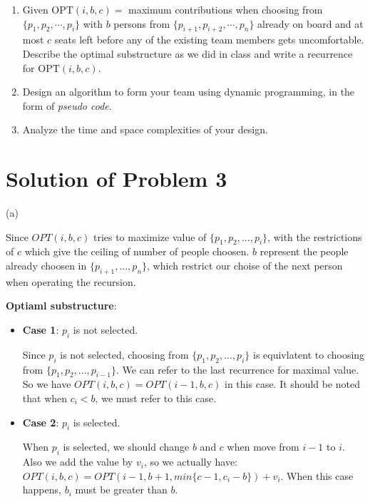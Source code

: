 \documentclass[12pt,a4paper]{article}
\theoremstyle{definition}
\begin{document}
\begin{enumerate}
	\begin{enumerate}
		\item Given $\text{OPT}(i, b, c)=$ maximum contributions when choosing from $\{p_1, p_2, \cdots, p_i\}$ with $b$ persons from $\{p_{i+1}, p_{i+2}, \cdots, p_n\}$ already on board and at most $c$ seats left before any of the existing team members gets uncomfortable. Describe the optimal substructure as we did in class and write a recurrence for $\text{OPT}(i, b, c)$.
		\item Design an algorithm to form your team using dynamic programming, in the form of \emph{pseudo code}.
        \item Analyze the time and space complexities of your design.
	\end{enumerate}
\end{enumerate}

\section*{Solution of Problem 3}

(a)

Since $OPT(i, b, c)$ tries to maximize value of $\{p_1, p_2, ..., p_i\}$, with the restrictions of $c$ which 
give the ceiling of number of people choosen. $b$ represent the people already choosen in  $\{p_{i+1}, ..., p_{n}\}$, 
which restrict our choise of the next person when operating the recursion. 

\textbf{Optiaml substructure}:

\begin{itemize}
	\item \textbf{Case 1}: $p_i$ is not selected.
	 
	Since $p_i$ is not selected, choosing from $\{p_1, p_2, ..., p_i\}$ is equivlatent to choosing from $\{p_1, p_2, ..., p_{i-1}\}$. We can refer to the last recurrence 
	for maximal value. So we have $OPT(i, b, c) = OPT(i-1, b, c)$ in this case. It should be noted that when $c_i < b$, we must 
	refer to this case.

	\item \textbf{Case 2}: $p_i$ is selected.
	
	When $p_i$ is selected, we should change $b$ and $c$ when move from $i-1$ to $i$. Also we add the value by $v_i$, so we actually have:
	$OPT(i, b, c) = OPT(i - 1, b + 1, min\{c-1, c_i - b\}) + v_i$. When this case happens, $b_i$ must be greater than $b$.

\end{itemize}
\end{document}
